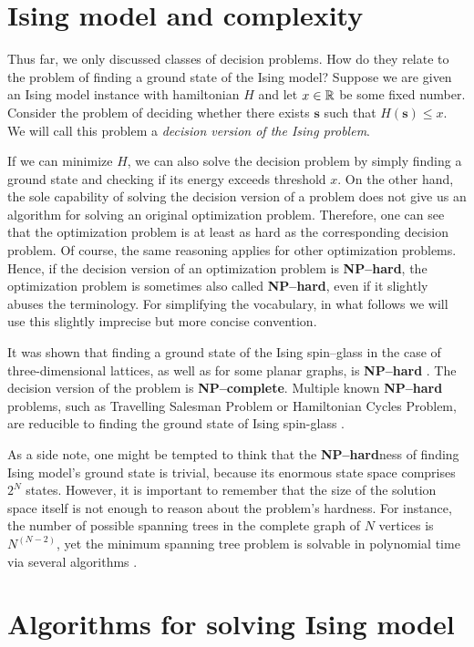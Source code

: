 \section{Ising model and complexity}

Thus far, we only discussed classes of decision problems. How do they relate to
the problem of finding a ground state of the Ising model? Suppose we are given
an Ising model instance with hamiltonian $H$ and let $x \in \mathbb{R}$ be some fixed
number. Consider the problem of deciding whether there exists $\mathbf{s}$ such
    that $H(\mathbf{s}) \le x$. We will call this problem a \emph{decision version
  of the Ising problem}.

If we can minimize $H$, we can also solve the decision problem by simply
finding a ground state and checking if its energy exceeds threshold $x$. On the
other hand, the sole capability of solving the decision version of a problem
does not give us an algorithm for solving an original optimization problem.
Therefore, one can see that the optimization problem is at least as hard as the
corresponding decision problem. Of course, the same reasoning applies for other
optimization problems. Hence, if the decision version of an optimization
problem is \textbf{NP--hard}, the optimization problem is sometimes also called
\textbf{NP--hard}, even if it slightly abuses the terminology. For simplifying
the vocabulary, in what follows we will use this slightly imprecise but more
concise convention.

It was shown that finding a ground state of the Ising spin--glass in the case
of three-dimensional lattices, as well as for some planar graphs, is
\textbf{NP--hard} \cite{barahoma}. The decision version of the problem is
\textbf{NP--complete}. Multiple known \textbf{NP--hard} problems, such as
Travelling Salesman Problem or Hamiltonian Cycles Problem, are reducible to
finding the ground state of Ising spin-glass \cite{lucas}.

As a side note, one might be tempted to think that the \textbf{NP--hard}ness of
finding Ising model's ground state is trivial, because its enormous state space
comprises $2^{N}$ states. However, it is important to remember that the size of
    the solution space itself is not enough to reason about the problem's hardness.
    For instance, the number of possible spanning trees in the complete graph of
  $N$ vertices is $N^{(N-2)}$, yet the minimum spanning tree problem is solvable
in polynomial time via several algorithms \cite{clrs}.

\section{Algorithms for solving Ising model}

